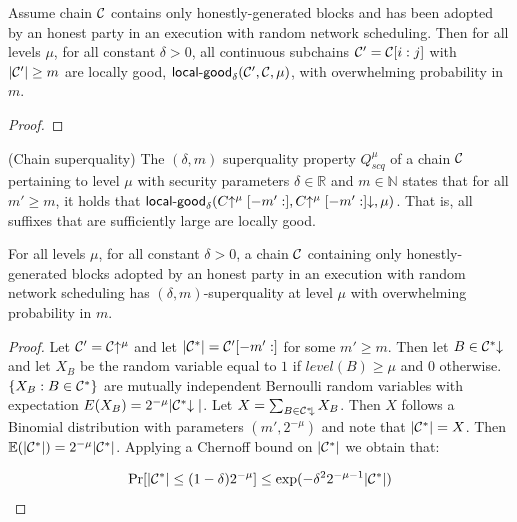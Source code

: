 \begin{lemma}\label{lem:localgood}
Assume chain $\mathcal{C}$ contains only honestly-generated blocks and has been
adopted by an honest party in an execution with random network scheduling. Then
for all levels $\mu$, for all constant $\delta > 0$, all continuous subchains
$\mathcal{C}' = \mathcal{C}[i:j]$ with $|\mathcal{C}'| \geq m$ are locally good,
$\textsf{local-good}_{\delta}(\mathcal{C}', \mathcal{C}, \mu)$, with overwhelming
probability in $m$.
\end{lemma}
\begin{proof}
\end{proof}

\begin{definition}{(Chain superquality)}
The $(\delta, m)$ superquality property
$Q^\mu_{scq}$ of a chain $\mathcal{C}$ pertaining to level $\mu$ with security
parameters $\delta \in \mathbb{R}$ and $m \in \mathbb{N}$ states that for all
$m' \geq m$, it holds that $\textsf{local-good}_{\delta}(C\negthickspace\uparrow^\mu[-m':],
C\negthickspace\uparrow^\mu[-m':]\negthickspace\downarrow, \mu)$. That is, all suffixes that are
sufficiently large are locally good.
\end{definition}

\begin{lemma}\label{lem:superquality}
For all levels $\mu$, for all constant $\delta > 0$, a chain
$\mathcal{C}$ containing only honestly-generated blocks adopted by an honest party in
an execution with random network scheduling has $(\delta, m)$-superquality at level
$\mu$ with overwhelming probability in $m$.
\end{lemma}

\begin{proof}
Let $\mathcal{C}' = \mathcal{C}\negthickspace\uparrow^\mu$ and let $|\mathcal{C}^*| =
\mathcal{C}'[-m':]$ for some $m' \geq m$. Then let $B \in \mathcal{C}^*\negthickspace\downarrow$ and let
$X_B$ be the random variable equal to $1$ if $\textit{level}(B) \geq \mu$ and
$0$ otherwise. $\{ X_B: B \in \mathcal{C}^* \}$ are mutually independent Bernoulli
random variables with expectation $E(X_B) = 2^{-\mu}|\mathcal{C}^*\negthickspace\downarrow|$. Let
$X = \sum_{B \in \mathcal{C}^*\negthickspace\downarrow}{X_B}$. Then $X$ follows a Binomial
distribution with parameters $(m', 2^{-\mu})$ and note that $|\mathcal{C}^*| = X$.
Then $\mathbb{E}(|\mathcal{C}^*|) = 2^{-\mu}|\mathcal{C}^*|$. Applying a Chernoff bound on
$|\mathcal{C}^*|$ we obtain that:

\begin{equation*}
\Pr[|\mathcal{C}^*| \leq (1 - \delta)2^{-\mu}] \leq
\exp(-\delta^2 2^{-\mu-1}|\mathcal{C}^*|)
\end{equation*}
\end{proof}


